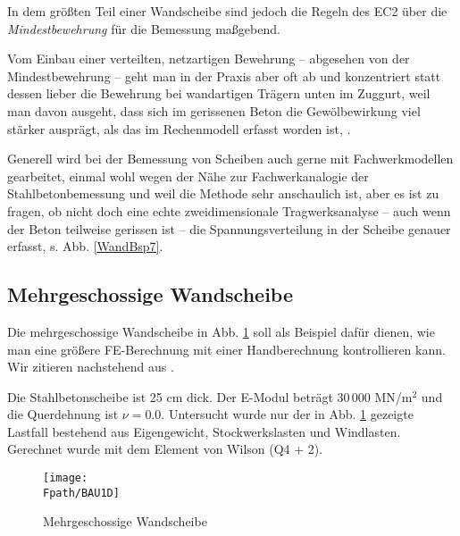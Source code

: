 {In dem gr\"{o}{\ss}ten Teil einer Wandscheibe sind jedoch die Regeln des EC2 \"{u}ber die {\em Mindestbewehrung\/} f\"{u}r die Bemessung ma{\ss}gebend.

Vom Einbau einer verteilten, netzartigen Bewehrung -- abgesehen von der Mindestbewehrung -- geht man in der Praxis aber oft ab und konzentriert statt dessen lieber die Bewehrung bei wandartigen Tr\"{a}gern unten im Zuggurt, weil man davon ausgeht, dass sich im gerissenen Beton die Gew\"{o}lbewirkung viel st\"{a}rker auspr\"{a}gt, als das im Rechenmodell erfasst worden ist, \cite{Rombach}.

Generell wird bei der Bemessung von Scheiben auch gerne mit Fachwerkmodellen gearbeitet, einmal wohl wegen der N\"{a}he zur Fachwerkanalogie der Stahlbetonbemessung und weil die Methode sehr anschaulich ist, aber es ist zu fragen, ob nicht doch eine echte zweidimensionale Tragwerksanalyse -- auch wenn der Beton teilweise gerissen ist -- die Spannungsverteilung in der Scheibe genauer erfasst, s. Abb. \ref{WandBsp7}.

{\textcolor{sectionTitleBlue}{\section{Mehrgeschossige Wandscheibe}}}\label{Mehrgeschossige Wandscheibe}
Die mehrgeschossige Wandscheibe in Abb. \ref{Bau1} soll als Beispiel daf\"{u}r dienen, wie man eine gr\"{o}{\ss}ere FE-Berechnung mit einer Handberechnung kontrollieren kann. Wir zitieren nachstehend aus \cite{Baumann2}.

Die Stahlbetonscheibe ist 25 cm dick. Der E-Modul betr\"{a}gt 30\,000 MN/m$^2$ und die Querdehnung ist $\nu = 0.0$. Untersucht wurde nur der in Abb. \ref{Bau1} gezeigte Lastfall bestehend aus Eigengewicht, Stockwerkslasten und Windlasten. Gerechnet wurde mit dem Element von Wilson (Q4 + 2).
\begin{figure}[tbp] \centering
\if {} \sidecaption \fi
\texttt{[image: \\Fpath/BAU1D]}
\caption{Mehrgeschossige Wandscheibe} \label{Bau1}
\end{figure}%

}
